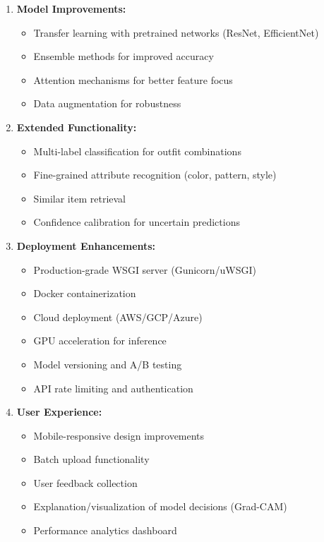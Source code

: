 \documentclass[12pt,a4paper]{article}
\begin{document}
\begin{enumerate}
    \item \textbf{Model Improvements:}
    \begin{itemize}
        \item Transfer learning with pretrained networks (ResNet, EfficientNet)
        \item Ensemble methods for improved accuracy
        \item Attention mechanisms for better feature focus
        \item Data augmentation for robustness
    \end{itemize}
    
    \item \textbf{Extended Functionality:}
    \begin{itemize}
        \item Multi-label classification for outfit combinations
        \item Fine-grained attribute recognition (color, pattern, style)
        \item Similar item retrieval
        \item Confidence calibration for uncertain predictions
    \end{itemize}
    
    \item \textbf{Deployment Enhancements:}
    \begin{itemize}
        \item Production-grade WSGI server (Gunicorn/uWSGI)
        \item Docker containerization
        \item Cloud deployment (AWS/GCP/Azure)
        \item GPU acceleration for inference
        \item Model versioning and A/B testing
        \item API rate limiting and authentication
    \end{itemize}
    
    \item \textbf{User Experience:}
    \begin{itemize}
        \item Mobile-responsive design improvements
        \item Batch upload functionality
        \item User feedback collection
        \item Explanation/visualization of model decisions (Grad-CAM)
        \item Performance analytics dashboard
    \end{itemize}
    

\end{enumerate}
\end{document}
